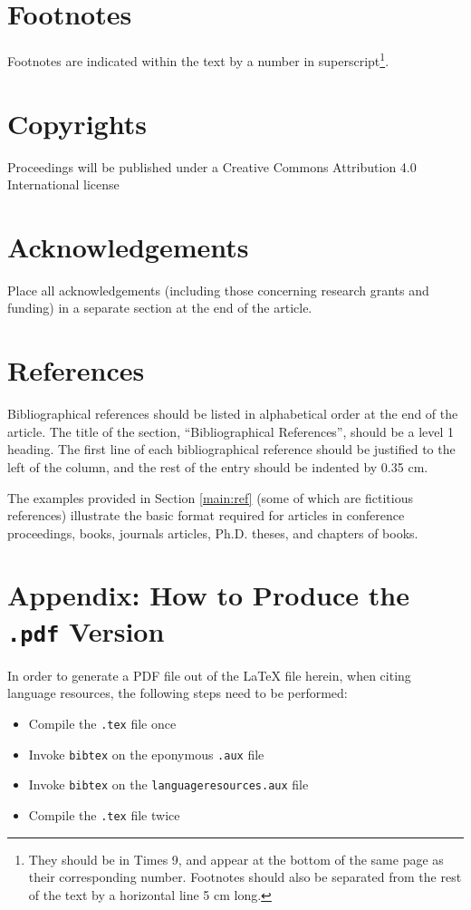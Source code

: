 \documentclass[10pt, a4paper]{article}
\begin{document}
\section{Footnotes}

Footnotes are indicated within the text by a number in superscript\footnote{They
should be in Times 9, and appear at the bottom of the same page as their
corresponding number. Footnotes should also be separated from the rest of the
text by a horizontal line 5 cm long.}.

\section{Copyrights}

Proceedings will be published under a Creative Commons Attribution 4.0 International license

\section{Acknowledgements}

Place all acknowledgements (including those concerning research grants and
funding) in a separate section at the end of the article.

\section{ References}

Bibliographical references should be listed in alphabetical order at the
end of the article. The title of the section, ``Bibliographical References'',
should be a level 1 heading. The first line of each bibliographical reference
should be justified to the left of the column, and the rest of the entry should
be indented by 0.35 cm.

The examples provided in Section \ref{main:ref} (some of which are fictitious
references) illustrate the basic format required for articles in conference
proceedings, books, journals articles, Ph.D. theses, and chapters of books.

\section*{Appendix: How to Produce the \texttt{.pdf} Version}

In order to generate a PDF file out of the LaTeX file herein, when citing
language resources, the following steps need to be performed:

\begin{itemize}
    \item{Compile the \texttt{.tex} file once}
    \item{Invoke \texttt{bibtex} on the eponymous \texttt{.aux} file}
    \item{Invoke \texttt{bibtex} on the \texttt{languageresources.aux} file}
    \item{Compile the \texttt{.tex} file twice}
\end{itemize}

\label{main:ref}



\end{document}
